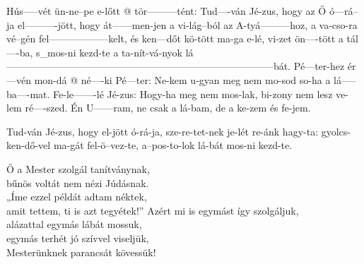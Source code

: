 \documentclass[twoside]{article}
\begin{document}
\begin{gregosheet}
            {  Hús-----vét   ün-ne--pe  e-lőtt      @       tör---------tént: Tud----ván Jé-zus, hogy az Ő     ó---rá--ja  el----------jött, hogy át------men-jen a vi-lág--ból az A-tyá---------hoz, a va-cso-ra  vé--gén fel------------------kelt, és ken---dőt     kö-tött ma-ga  e-lé,        vi-zet ön----tött a tál----ba,  s_mos-ni kezd-te  a ta-nít-vá-nyok lá---------------------------------------------------------------------------------bát. Pé---ter-hez ér---vén  mon-dá   @      né----ki Pé---ter: Ne-kem u-gyan meg nem mo-sod so-ha a lá-----ba----mat. Fe-le-------lé  Jé-zus:  Hogy-ha meg nem mos-lak, bi-zony nem lesz ve-lem ré----szed. Én U------ram,         ne csak a lá-bam, de a ke-zem és fe-jem.}
\end{gregosheet}


\begin{gregosheet}
            {    Tud-ván Jé-zus, hogy el-jött ó-rá-ja,  sze-re-tet-nek  je-lét re-ánk hagy-ta:  gyolcs-ken-dő-vel  ma-gát fel-ö--vez-te,  a--pos-to-lok  lá-bát mos-ni kezd-te.}
\end{gregosheet}

\begin{hymnstanzas}
  Ő a Mester szolgál tanítványnak,\\
  bűnös voltát nem nézi Júdásnak.\\
  „Íme ezzel példát adtam néktek,\\
  amit tettem, ti is azt tegyétek!”
\stanzabreak
  Azért mi is egymást így szolgáljuk,\\
  alázattal egymás lábát mossuk,\\
  egymás terhét jó szívvel viseljük,\\
  Mesterünknek parancsát kövessük!
\end{hymnstanzas}
\end{document}
